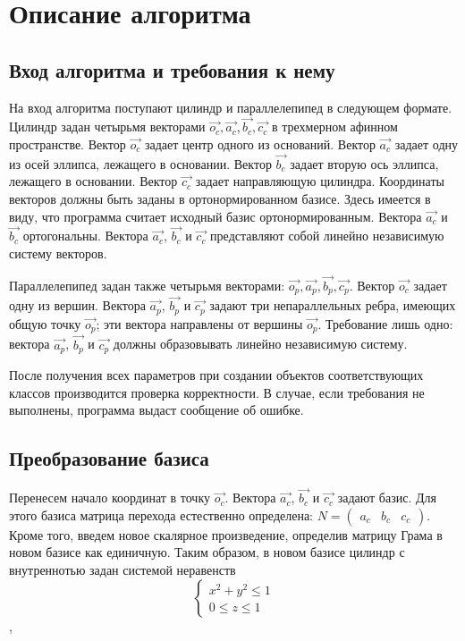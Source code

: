 \documentclass[pdftex,ptm,12pt,a4paper]{report}
\begin{document}
\chapter{Описание алгоритма}
    \section{Вход алгоритма и требования к нему}
      На вход алгоритма поступают цилиндр и параллелепипед в следующем формате.
      Цилиндр задан четырьмя векторами $\vec{o_c}, \vec{a_c}, \vec{b_c}, \vec{c_c}$ в трехмерном афинном пространстве.
      Вектор $\vec{o_c}$ задает центр одного из оснований.
      Вектор $\vec{a_c}$ задает одну из осей эллипса, лежащего в основании.
      Вектор $\vec{b_c}$ задает вторую ось эллипса, лежащего в основании.
      Вектор $\vec{ c_c}$ задает направляющую цилиндра.
      Координаты векторов должны быть заданы в ортонормированном базисе.
      Здесь имеется в виду, что программа считает исходный базис ортонормированным.
      Вектора $\vec{a_c}$ и $\vec{b_c}$ ортогональны.
      Вектора $\vec{a_c}$, $\vec{b_c}$ и $\vec{c_c}$ представляют собой линейно независимую систему векторов.

      Параллелепипед задан также четырьмя векторами: $\vec{o_p}, \vec{a_p}, \vec{b_p}, \vec{c_p}$.
      Вектор $\vec{o_c}$ задает одну из вершин.
      Вектора $\vec{a_p}$, $\vec{b_p}$ и $\vec{c_p}$ задают три непараллельных ребра, имеющих общую точку $\vec{o_p}$; эти вектора направлены от вершины $\vec{o_p}$.
      Требование лишь одно: вектора $\vec{a_p}$, $\vec{b_p}$ и $\vec{c_p}$ должны образовывать линейно независимую систему.

      После получения всех параметров при создании объектов соответствующих классов производится проверка корректности.
      В случае, если требования не выполнены, программа выдаст сообщение об ошибке.
\section{Преобразование базиса}
      Перенесем начало координат в точку $\vec{o_c}$.
      Вектора $\vec{a_c}$, $\vec{b_c}$ и $\vec{c_c}$ задают базис.
      Для этого базиса матрица перехода естественно определена:
      $N = \begin{pmatrix} {a_c} & {b_c} & c_{c} \end{pmatrix}$.
      Кроме того, введем новое скалярное произведение, определив матрицу Грама в новом базисе как единичную.
      Таким образом, в новом базисе цилиндр с внутреннотью задан системой неравенств
      \begin{equation}\label{cnb}
          \begin{cases}
          x^2 + y^2   \le  1  \\
          0 \le  z   \le  1
          \end{cases}
      \end{equation},
\end{document}
